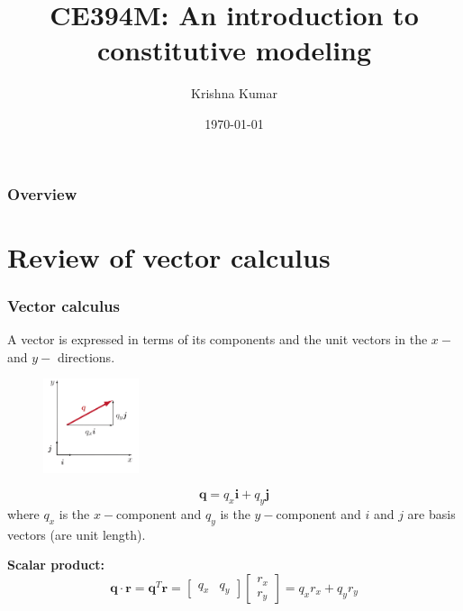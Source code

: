 \documentclass[notes]{beamer}
\title[CE394M: Constitutive modeling]{CE394M: An introduction to constitutive modeling}
\author{Krishna Kumar} %
\institute[UT Austin] %
{
University of Texas at Austin \\
\medskip
\textit{
  \url{krishnak@utexas.edu}} %
}
\date{\today} %
\begin{document}
\begin{frame}
\titlepage %
\end{frame}

\begin{frame}
 \frametitle{Overview}
 \tableofcontents
\end{frame}

\section{Review of vector calculus}
\begin{frame}
\frametitle{Vector calculus}
A vector is expressed in terms of its components and the unit vectors in the $x-$ and $y-$ directions.
\begin{figure}[ht]
	\centering
	\includegraphics[width=0.25\textwidth]{figs/vector-q.png}
\end{figure}
\begin{equation*}
	\mathbf{q} = q_x \mathbf{i} + q_y \mathbf{j}
\end{equation*}
where $q_x$ is the $x-$component and $q_y$ is the $y-$component and $i$ and $j$ are basis vectors (are unit length).

\textbf{Scalar product:}
\begin{equation*}
\mathbf{q} \cdot \mathbf{r} = \mathbf{q}^T \mathbf{r} = \begin{bmatrix} q_x & q_y \end{bmatrix} \begin{bmatrix} r_x \\ r_y \end{bmatrix} = q_x r_x + q_y r_y
\end{equation*}
\end{frame}
\end{document}
